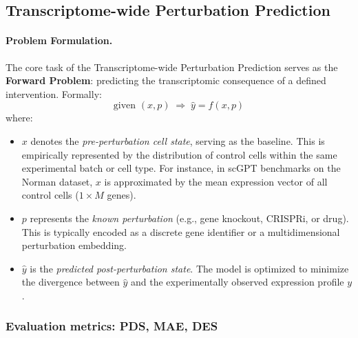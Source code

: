 \documentclass{article}
\begin{document}
\subsection{Transcriptome-wide Perturbation Prediction}

\paragraph{Problem Formulation.} The core task of the Transcriptome-wide Perturbation Prediction serves as the \textbf{Forward Problem}: predicting the transcriptomic consequence of a defined intervention. Formally:
\[
\text{given } (x, p) \;\Rightarrow\; \hat y = f(x, p)
\]
where:
\begin{itemize}
    \item $x$ denotes the \textit{pre-perturbation cell state}, serving as the baseline. This is empirically represented by the distribution of control cells within the same experimental batch or cell type. For instance, in scGPT benchmarks on the Norman dataset, $x$ is approximated by the mean expression vector of all control cells ($1 \times M$ genes).
    \item $p$ represents the \textit{known perturbation} (e.g., gene knockout, CRISPRi, or drug). This is typically encoded as a discrete gene identifier or a multidimensional perturbation embedding.
    \item $\hat{y}$ is the \textit{predicted post-perturbation state}. The model is optimized to minimize the divergence between $\hat{y}$ and the experimentally observed expression profile $y$.
\end{itemize}


\subsubsection{Evaluation metrics: PDS, MAE, DES}
\end{document}
